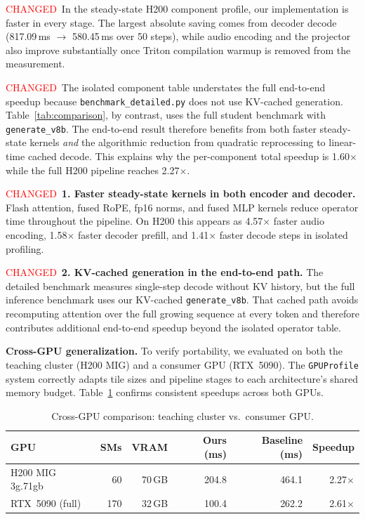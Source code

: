 \documentclass{article}
\newcommand{\chg}[1]{{\color{blue}#1}}
\newcommand{\chglabel}{{\setlength{\fboxsep}{1pt}\colorbox{yellow!45}{\textcolor{red}{\scriptsize CHANGED}}}}
\begin{document}
\chglabel\ \chg{In the steady-state H200 component profile, our implementation is faster in every stage.  The largest absolute saving comes from decoder decode (817.09\,ms $\to$ 580.45\,ms over 50 steps), while audio encoding and the projector also improve substantially once Triton compilation warmup is removed from the measurement.}

\chglabel\ \chg{The isolated component table understates the full end-to-end speedup because \texttt{benchmark\_detailed.py} does not use KV-cached generation.  Table~\ref{tab:comparison}, by contrast, uses the full student benchmark with \texttt{generate\_v8b}.  The end-to-end result therefore benefits from both faster steady-state kernels \emph{and} the algorithmic reduction from quadratic reprocessing to linear-time cached decode.  This explains why the per-component total speedup is 1.60$\times$ while the full H200 pipeline reaches 2.27$\times$.}

\chglabel\ \chg{\textbf{1. Faster steady-state kernels in both encoder and decoder.}
Flash attention, fused RoPE, fp16 norms, and fused MLP kernels reduce operator time throughout the pipeline.  On H200 this appears as 4.57$\times$ faster audio encoding, 1.58$\times$ faster decoder prefill, and 1.41$\times$ faster decode steps in isolated profiling.}

\chglabel\ \chg{\textbf{2. KV-cached generation in the end-to-end path.}
The detailed benchmark measures single-step decode without KV history, but the full inference benchmark uses our KV-cached \texttt{generate\_v8b}.  That cached path avoids recomputing attention over the full growing sequence at every token and therefore contributes additional end-to-end speedup beyond the isolated operator table.}

\textbf{Cross-GPU generalization.}
To verify portability, we evaluated on both the teaching cluster (H200 MIG) and a consumer GPU (RTX~5090).
The \texttt{GPUProfile} system correctly adapts tile sizes and pipeline stages to each architecture's shared memory budget.
Table~\ref{tab:crossgpu_main} confirms consistent speedups across both GPUs.

\begin{table}[h]
\centering
\caption{Cross-GPU comparison: teaching cluster vs.\ consumer GPU.}
\label{tab:crossgpu_main}
\small
\begin{tabular}{@{}lrrrrr@{}}
\toprule
\textbf{GPU} & \textbf{SMs} & \textbf{VRAM} & \textbf{Ours (ms)} & \textbf{Baseline (ms)} & \textbf{Speedup} \\
\midrule
H200 MIG 3g.71gb & 60 & 70\,GB & 204.8 & 464.1 & 2.27$\times$ \\
RTX~5090 (full) & 170 & 32\,GB & 100.4 & 262.2 & 2.61$\times$ \\
\bottomrule
\end{tabular}
\end{table}
\end{document}
